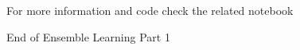 \documentclass[serif, aspectratio=169]{beamer}
\begin{document}
\begin{frame}
    \begin{center}
        {\Huge\ \color{red}For more information and code check the related notebook}
    \end{center}
\end{frame}

\begin{frame}
    \begin{center}
        {\Huge\ End of Ensemble Learning Part 1}
    \end{center}
\end{frame}
\end{document}
